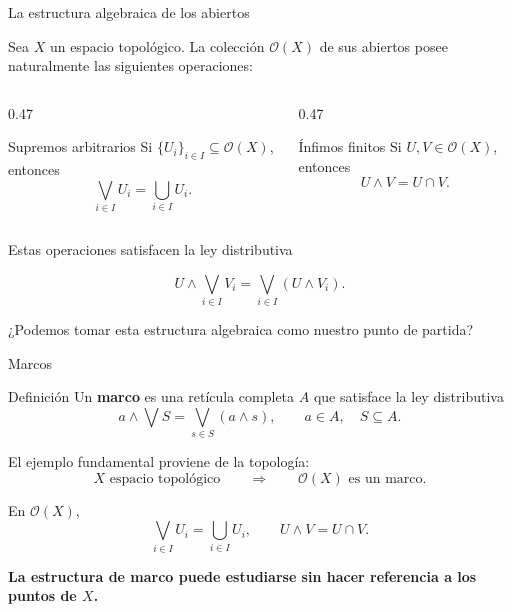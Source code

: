 \documentclass[compress,12pt]{beamer}
\begin{document}
\begin{frame}{La estructura algebraica de los abiertos}
\small{
Sea $X$ un espacio topológico. La colección $\mathcal O(X)$ de sus
abiertos posee naturalmente las siguientes operaciones:

\begin{columns}[T]

    \begin{column}{0.47\textwidth}
        \begin{block}{Supremos arbitrarios}
            Si $\{U_i\}_{i\in I}\subseteq\mathcal O(X)$, entonces
            \[
                \bigvee_{i\in I}U_i
                =
                \bigcup_{i\in I}U_i.
            \]
        \end{block}
    \end{column}

    \begin{column}{0.47\textwidth}
        \begin{block}{Ínfimos finitos}
            Si $U,V\in\mathcal O(X)$, entonces
            \[
                U\wedge V
                =
                U\cap V.
            \]
        \end{block}
    \end{column}

\end{columns}

Estas operaciones satisfacen la ley distributiva

\[
    U\wedge\bigvee_{i\in I}V_i
    =
    \bigvee_{i\in I}(U\wedge V_i).
\]

    \centering
    ¿Podemos tomar esta estructura algebraica como nuestro punto de partida?

}
\end{frame}

\begin{frame}{Marcos}
\small{
\begin{block}{Definición}
Un \textbf{marco} es una retícula completa $A$ que satisface la
ley distributiva
\[
    a\wedge\bigvee S
    =
    \bigvee_{s\in S}(a\wedge s),
    \qquad a\in A,\quad S\subseteq A.
\]
\end{block}

\pause

\medskip

El ejemplo fundamental proviene de la topología:
\[
\boxed{
    X\text{ espacio topológico}
    \qquad\Longrightarrow\qquad
    \mathcal O(X)\text{ es un marco}.
}
\]

\pause

\medskip

En $\mathcal O(X)$,
\[
    \bigvee_{i\in I}U_i=\bigcup_{i\in I}U_i,
    \qquad
    U\wedge V=U\cap V.
\]

\begin{center}
\textbf{La estructura de marco puede estudiarse sin hacer referencia
a los puntos de $X$.}
\end{center}
}
\end{frame}
\end{document}
